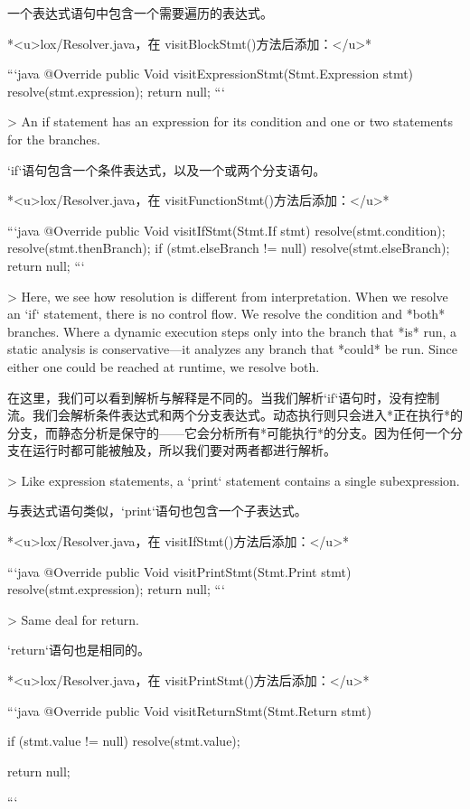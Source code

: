 \documentclass[cn,11pt,chinese]{elegantbook}
\begin{document}
{{{{{{{{{{{{{一个表达式语句中包含一个需要遍历的表达式。

*<u>lox/Resolver.java，在 visitBlockStmt()方法后添加：</u>*

```java
  @Override
  public Void visitExpressionStmt(Stmt.Expression stmt) {
    resolve(stmt.expression);
    return null;
  }
```

> An if statement has an expression for its condition and one or two statements for the branches.

`if`语句包含一个条件表达式，以及一个或两个分支语句。

*<u>lox/Resolver.java，在 visitFunctionStmt()方法后添加：</u>*

```java
  @Override
  public Void visitIfStmt(Stmt.If stmt) {
    resolve(stmt.condition);
    resolve(stmt.thenBranch);
    if (stmt.elseBranch != null) resolve(stmt.elseBranch);
    return null;
  }
```

> Here, we see how resolution is different from interpretation. When we resolve an `if` statement, there is no control flow. We resolve the condition and *both* branches. Where a dynamic execution steps only into the branch that *is* run, a static analysis is conservative—it analyzes any branch that *could* be run. Since either one could be reached at runtime, we resolve both.

在这里，我们可以看到解析与解释是不同的。当我们解析`if`语句时，没有控制流。我们会解析条件表达式和两个分支表达式。动态执行则只会进入*正在执行*的分支，而静态分析是保守的——它会分析所有*可能执行*的分支。因为任何一个分支在运行时都可能被触及，所以我们要对两者都进行解析。

> Like expression statements, a `print` statement contains a single subexpression.

与表达式语句类似，`print`语句也包含一个子表达式。

*<u>lox/Resolver.java，在 visitIfStmt()方法后添加：</u>*

```java
  @Override
  public Void visitPrintStmt(Stmt.Print stmt) {
    resolve(stmt.expression);
    return null;
  }
```

> Same deal for return.

`return`语句也是相同的。

*<u>lox/Resolver.java，在 visitPrintStmt()方法后添加：</u>*

```java
  @Override
  public Void visitReturnStmt(Stmt.Return stmt) {
    if (stmt.value != null) {
      resolve(stmt.value);
    }

    return null;
  }
```

}}}}}}}}}}}}}
\end{document}
